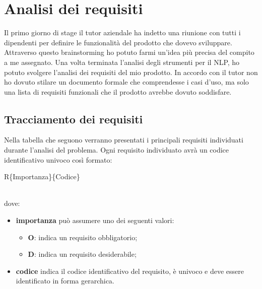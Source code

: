 
\chapter{Analisi dei requisiti}
\label{cap:analisi}

Il primo giorno di stage il tutor aziendale ha indetto una riunione con tutti i dipendenti per definire le funzionalità del prodotto che dovevo sviluppare. Attraverso questo \gls{brainstorming} ho potuto farmi un'idea più precisa del compito a me assegnato. Una volta terminata l'analisi degli strumenti per il \gls{NLP}, ho potuto svolgere l'analisi dei requisiti del mio prodotto. In accordo con il tutor non ho dovuto stilare un documento formale che comprendesse i casi d'uso, ma solo una lista di requisiti funzionali che il prodotto avrebbe dovuto soddisfare.

\section{Tracciamento dei requisiti}
Nella tabella che seguono verranno presentati i principali requisiti individuati durante l’analisi del problema.
Ogni requisito individuato avrà un codice identificativo univoco così formato: \\
\centerline{R\{Importanza\}\{Codice\}} \\ 
dove:
\begin{itemize}
	\item \textbf{importanza} può assumere uno dei seguenti valori:
	\begin{itemize}
		\item \textbf{O}: indica un requisito obbligatorio;
		\item \textbf{D}: indica un requisito desiderabile;
	\end{itemize}
	\item \textbf{codice} indica il codice identificativo del requisito, è univoco e deve essere
identificato in forma gerarchica.
\end{itemize}

